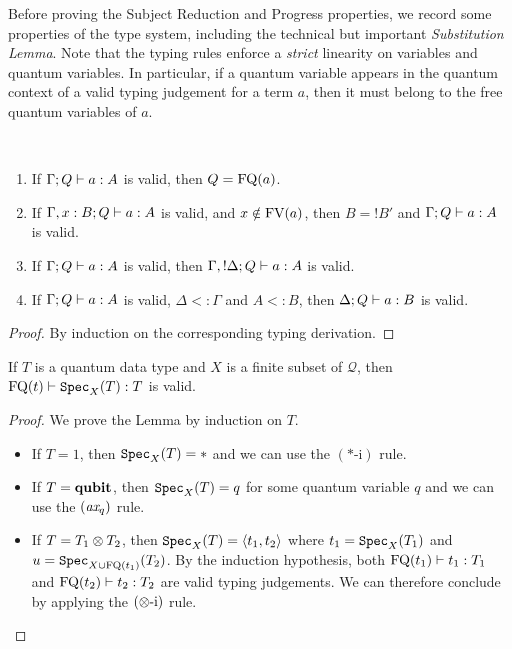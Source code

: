 \documentclass[twoside]{article}
\begin{document}
Before proving the Subject Reduction and Progress properties, we
record some properties of the type system, including the technical but
important \emph{Substitution Lemma}. Note that the typing rules
enforce a \emph{strict} linearity on variables and quantum
variables. In particular, if a quantum variable appears in the quantum
context of a valid typing judgement for a term $a$, then it must
belong to the free quantum variables of $a$.

\begin{lemma}~
\label{prop_type_syst}
\begin{enumerate}
  \item If $\Gamma; Q \vdash a:A$ is valid, 
  then $Q=\mathop{\textrm{FQ}}\nolimits(a)$.\label{q_context}
  \item If $\Gamma,x:B;Q \vdash a:A$ is valid, 
  and $x\notin \mathop{\textrm{FV}}\nolimits(a)$, then $B={!}B'$ and 
  $\Gamma;Q \vdash a:A$ is valid.\label{unused_var}
  \item If $\Gamma; Q \vdash a:A$ is valid, 
  then $\Gamma, {!}\Delta ; Q \vdash a:A$ is valid.\label{weakening}
  \item If $\Gamma ; Q \vdash a:A$ is valid, $\Delta <: \Gamma$
  and $A<:B$, then $\Delta ; Q \vdash a:B$ is valid.\label{subtype}
\end{enumerate}
\end{lemma}

\begin{proof}
By induction on the corresponding typing derivation.
\end{proof}

\begin{lemma}
\label{specimen}
If $T$ is a quantum data type and $X$ is a finite subset of
$\mathcal{Q}$, then $\mathop{\textrm{FQ}}\nolimits(t)\vdash \texttt{Spec}_X(T):T$ is valid.
\end{lemma}

\begin{proof}
We prove the Lemma by induction on $T$.
  \begin{itemize}
    \item If $T=1$, then $\texttt{Spec}_X(T)=*$ and we can use the $(*\mbox{-i})$ rule.
    \item If $T=\textrm{\bf qubit}$, then $\texttt{Spec}_X(T)=q$ for some quantum variable $q$ and we can 
          use the $(\textit{ax}_q)$ rule.
    \item If $T=T_1\otimes T_2$, then $\texttt{Spec}_X(T)=\langle t_1,t_2\rangle$ where $t_1=\texttt{Spec}_X(T_1)$ 
          and $u=\texttt{Spec}_{X\cup \mathop{\textrm{FQ}}\nolimits(t_1)}(T_2)$. By the induction hypothesis, both 
          $\mathop{\textrm{FQ}}\nolimits(t_1)\vdash t_1:T_1$ and $\mathop{\textrm{FQ}}\nolimits(t_2)\vdash t_2:T_2$ are valid typing 
          judgements. We can therefore conclude by applying the $(\otimes\mbox{-i})$ rule.
  \end{itemize}
\end{proof}
\end{document}
